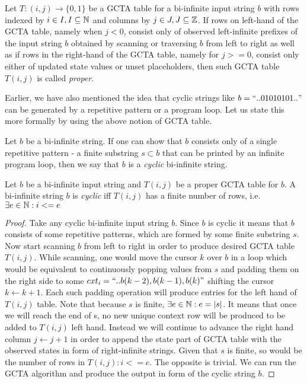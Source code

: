 \begin{definition}Let $T: (i,j) \to \{0,1\}$ be a GCTA table for a bi-infinite input string $b$ with rows indexed by $i \in I, I \subseteq \mathbb{N}$ and columns by $j \in J, J \subseteq \mathbb{Z}$. If rows on left-hand of the GCTA table, namely when $j < 0$, consist only of observed left-infinite prefixes of the input string $b$ obtained by scanning or traversing $b$ from left to right as well as if rows in the right-hand of the GCTA table, namely for $j >= 0$, consist only either of updated state values or unset placeholders, then such GCTA table $T(i,j)$ is called \textit{proper}.\end{definition}

Earlier, we have also mentioned the idea that cyclic strings like $b=\text{``}..01010101..\text{''}$ can be generated by a repetitive pattern or a program loop. Let us state this more formally by using the above notion of GCTA table.


\begin{definition}Let $b$ be a bi-infinite string. If one can show that $b$ consists only of a single repetitive pattern - a finite substring $s \subset b$ that can be printed by an infinite program loop, then we say that $b$ is a \textit{cyclic} bi-infinite string.\end{definition}

\begin{theorem}Let $b$ be a bi-infinite input string and $T(i,j)$ be a proper GCTA table for $b$. A bi-infinite string $b$ is \textit{cyclic} iff $T(i,j)$ has a finite number of rows, i.e. $\exists e \in \mathbb{N} : i <= e$\end{theorem}

\begin{proof}Take any cyclic bi-infinite input string $b$. Since $b$ is cyclic it means that $b$ consists of some repetitive patterns, which are formed by some finite substring $s$. Now start scanning $b$ from left to right in order to produce desired GCTA table $T(i,j)$. While scanning, one would move the cursor $k$ over $b$ in a loop which would be equivalent to continuously popping values from $s$ and padding them on the right side to some $cxt_i = \text{``}..b(k-2),b(k-1),b(k)\text{''}$ shifting the cursor $k \leftarrow k + 1$. Each such padding operation will produce entries for the left hand of $T(i, j)$ table. Note that because $s$ is finite, $\exists e \in \mathbb{N} : e = |s|$. It means that once we will reach the end of s, no new unique context row will be produced to be added to $T(i, j)$ left hand. Instead we will continue to advance the right hand column $j \leftarrow j + 1$ in order to append the state part of GCTA table with the observed states in form of right-infinite strings. Given that $s$ is finite, so would be the number of rows in $T(i,j) : i <= e$. The opposite is trivial. We can run the GCTA algorithm and produce the output in form of the cyclic string $b$.\end{proof}

